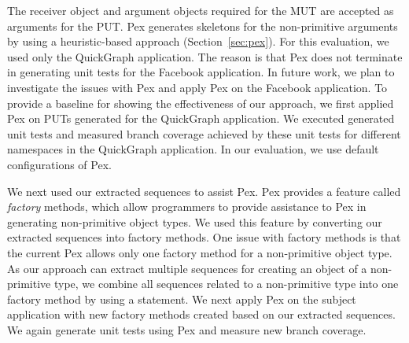 The receiver object and argument objects required for the  MUT are accepted as arguments for the PUT. Pex generates skeletons for the non-primitive arguments by using a heuristic-based approach (Section~\ref{sec:pex}). For this evaluation, we used only the QuickGraph application. The reason is that Pex does not terminate in generating unit tests for the Facebook application. In future work, we plan to investigate the issues with Pex and apply Pex on the Facebook application. To provide a baseline for showing the effectiveness of our approach, we first applied Pex on PUTs generated for the QuickGraph application. We executed generated unit tests and measured branch coverage achieved by these unit tests for different namespaces in the QuickGraph application. In our evaluation, we use default configurations of Pex.

We next used our extracted sequences to assist Pex. Pex provides a feature called \emph{factory} methods, which allow programmers to provide assistance to Pex in generating non-primitive object types. We used this feature by converting our extracted sequences into factory methods. One issue with factory methods is that the current Pex allows only one factory method for a non-primitive object type. As our approach can extract multiple sequences for creating an object of a non-primitive type, we combine all sequences related to a non-primitive type into one factory method by using a  statement. We next apply Pex on the subject application with new factory methods created based on our extracted sequences. We again generate unit tests using Pex and measure new branch coverage. 

